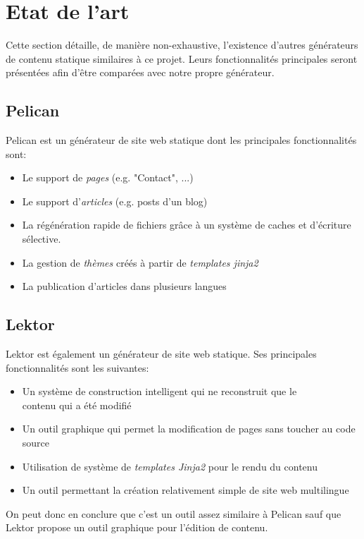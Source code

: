 \section{Etat de l'art}
	
	Cette section détaille, de manière non-exhaustive, l'existence d'autres générateurs de contenu statique similaires à ce projet. Leurs fonctionnalités principales seront présentées afin d'être comparées avec notre propre générateur.
	
	\subsection*{Pelican}
	Pelican \cite{Pelican} est un générateur de site web statique dont les principales fonctionnalités sont:
	\begin{itemize}
		\item Le support de \textit{pages} (e.g. "Contact", ...)
		\item Le support d'\textit{articles} (e.g. posts d'un blog)
		\item La régénération rapide de fichiers grâce à un système de caches et d'écriture sélective.
		\item La gestion de \textit{thèmes} créés à partir de \textit{templates jinja2}
		\item La publication d'articles dans plusieurs langues
	\end{itemize}
	
	\subsection*{Lektor}
	Lektor \cite{Lektor} est également un générateur de site web statique. Ses principales fonctionnalités sont les suivantes:
	
	\begin{itemize}
		\item Un système de construction intelligent qui ne reconstruit que le \\contenu qui a été modifié
		\item Un outil graphique qui permet la modification de pages sans toucher au code source
		\item Utilisation de système de \textit{templates Jinja2} pour le rendu du contenu
		\item Un outil permettant la création relativement simple de site web multilingue
	\end{itemize}
	
	On peut donc en conclure que c'est un outil assez similaire à Pelican sauf que Lektor propose un outil graphique pour l'édition de contenu.
	

